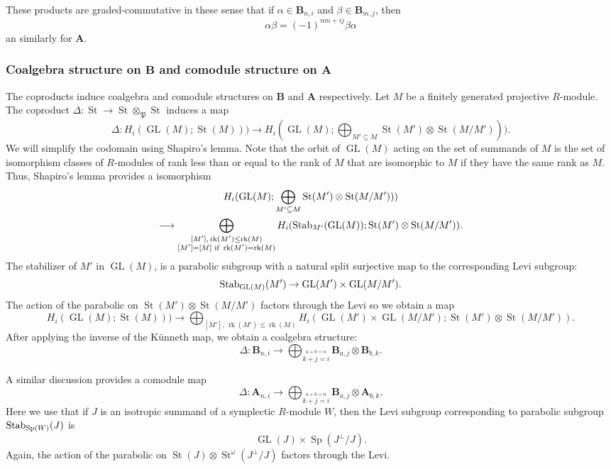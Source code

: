 \documentclass[11pt,letterpaper]{amsart}
\DeclareMathOperator{\Sp}{Sp}
\newcommand{\HH}{\mathbf{B}}
\newcommand{\HA}{\mathbf{A}}
\newcommand{\PP}{\mathfrak{P}}
\numberwithin{theoremcounter}{section}
\theoremstyle{definition}
\theoremstyle{remark}
\newcommand{\mr}[1]{{\rm #1}}
\newcommand{\Stab}{\mr{Stab}}
\DeclareMathOperator{\rk}{rk}
\DeclareMathOperator{\GL}{GL}
\DeclareMathOperator{\St}{St}
\begin{document}
These products are graded-commutative in these sense that if $\alpha \in \HH_{n,i}$ and $\beta \in \HH_{m,j}$, then $$ \alpha \beta=(-1)^{nm+ij}\beta \alpha$$ an similarly for $\HA$.

\subsubsection{Coalgebra structure on $\HH$ and comodule structure on $\HA$}

The coproducts induce coalgebra and comodule structures on $\HH$ and $\HA$ respectively. Let $M$ be a finitely generated projective $R$-module. The coproduct $\Delta \colon \St \to \St \otimes_\PP \St $ induces a map $$\Delta\colon  H_i(\GL(M);\St(M))) \to H_i(\GL(M);\bigoplus_{M' \subseteq M } \St(M') \otimes \St(M/M') )).$$ We will simplify the codomain using Shapiro's lemma. Note that the orbit of $\GL(M)$ acting on the set of summands of $M$ is the set of isomorphism classes of $R$-modules of rank less than or equal to the rank of $M$ that are isomorphic to $M$ if they have the same rank as $M$. Thus, Shapiro's lemma provides a isomorphism \begin{multline*}H_i(\GL(M);\bigoplus_{M' \subseteq M } \St(M') \otimes \St(M/M') ))\\ \longrightarrow \bigoplus_{\substack{[M'],\, \rk(M')\leq \rk(M)\\ [M'] = [M] \text{ if } \rk(M') = \rk(M)}} H_i(\Stab_{M'}(\GL(M));\St(M') \otimes \St(M/M')).\end{multline*} 
The stabilizer of $M'$ in $\GL(M)$, is a parabolic subgroup with a natural split surjective map to the corresponding Levi subgroup:
$$\Stab_{\GL(M)}(M') \to \GL(M') \times \GL(M/M').$$ The action of the parabolic on $\St(M') \otimes \St(M/M')$ factors through the Levi so we obtain a map $$H_i(\GL(M);\St(M))) \to \bigoplus_{[M'],\, \rk(M')\leq \rk(M)} H_i( \GL(M') \times \GL(M/M') ;\St(M') \otimes \St(M/M')). $$
 After applying the inverse of the K\"unneth map, we obtain a coalgebra structure: $$\Delta \colon  \HH_{n,i} \to \bigoplus_{\overset{a+b=n}{k+j=i}} \HH_{a,j} \otimes \HH_{b,k}.$$ 

A similar discussion provides a comodule map $$\Delta \colon  \HA_{n,i} \to \bigoplus_{\overset{a+b=n}{k+j=i}} \HH_{a,j} \otimes \HA_{b,k}.$$ Here we use that if $J$ is an isotropic summand of a symplectic $R$-module $W$, then the Levi subgroup corresponding to parabolic subgroup $\Stab_{\Sp(W)}(J)$ is $$\GL(J) \times \Sp(J^\perp/J).$$ Again, the action of the parabolic on $ \St(J) \otimes \St^\omega(J^\perp/J)$ factors through the Levi.
\end{document}
